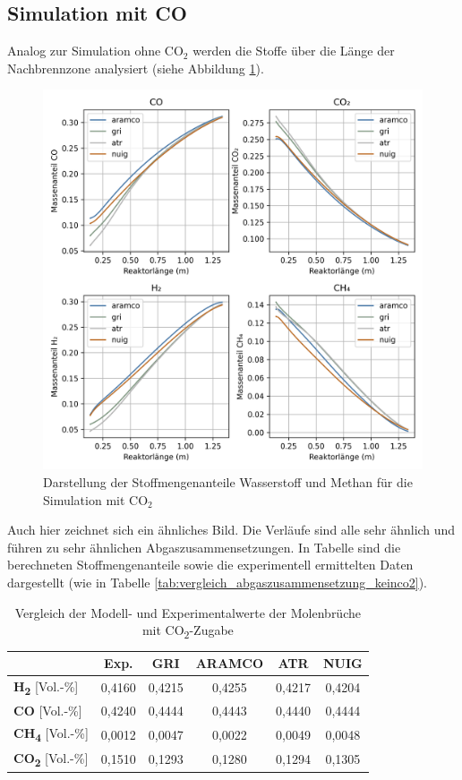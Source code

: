 \documentclass[footmark=none]{tubaf-thesis}
\begin{document}
        \subsection{Simulation mit CO }
        Analog zur Simulation ohne CO$_2$ werden die Stoffe über die Länge der Nachbrennzone analysiert (siehe Abbildung \ref{fig:vergleich_h2_ch4_co2}).
        \begin{figure}[H]
            \centering
            \includegraphics[width=0.8\linewidth]{img_py/H2_CH4_CO_CO2.png}
            \caption{Darstellung der Stoffmengenanteile Wasserstoff und Methan für die Simulation mit CO$_2$}
            \label{fig:vergleich_h2_ch4_co2}
        \end{figure}
        Auch hier zeichnet sich ein ähnliches Bild. Die Verläufe sind alle sehr ähnlich und führen zu sehr ähnlichen Abgaszusammensetzungen. In Tabelle sind die berechneten Stoffmengenanteile sowie die experimentell ermittelten Daten dargestellt (wie in Tabelle \ref{tab:vergleich_abgaszusammensetzung_keinco2}).
        \begin{table}[H]
            \centering
            \label{tab:vergleich_abgaszusammensetzung_co2}
            \caption{Vergleich der Modell- und Experimentalwerte der Molenbrüche mit CO\textsubscript{2}-Zugabe}
            \begin{tabular}{lccccc}
                \toprule
                & \textbf{Exp.} & \textbf{GRI} & \textbf{ARAMCO} & \textbf{ATR} & \textbf{NUIG} \\
                \midrule
                \textbf{H\textsubscript{2}} [Vol.-\%]   & 0{,}4160 & 0{,}4215 & 0{,}4255 & 0{,}4217 & 0{,}4204 \\
                \textbf{CO} [Vol.-\%]                  & 0{,}4240 & 0{,}4444 & 0{,}4443 & 0{,}4440 & 0{,}4444 \\
                \textbf{CH\textsubscript{4}} [Vol.-\%] & 0{,}0012 & 0{,}0047 & 0{,}0022 & 0{,}0049 & 0{,}0048 \\
                \textbf{CO\textsubscript{2}} [Vol.-\%] & 0{,}1510 & 0{,}1293 & 0{,}1280 & 0{,}1294 & 0{,}1305 \\
                \bottomrule
            \end{tabular}
        \end{table}
\end{document}
